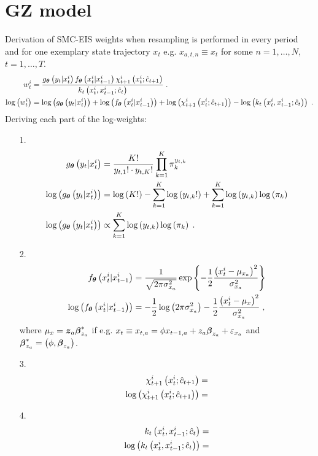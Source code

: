 \section*{GZ model}
Derivation of SMC-EIS weights when resampling is performed in every period and for one exemplary state trajectory $x_t$ e.g. $x_{a,t,n}\equiv x_t$ for some $n=1,\ldots,N$, $t=1,\ldots,T$.
\begin{align*}
w_t^i &= 
\frac
{
g_{\boldsymbol{\theta}}\left(y_t \lvert x_t^i\right) f_{\boldsymbol{\theta}}\left(x_t^i \lvert x_{t-1}^i\right)
\chi_{t+1}^{i}\left(x_{t}^{i}; \hat{c}_{t+1}\right)
}
{
k_{t}\left(x_{t}^{i}, x_{t-1}^{i}; \hat{c}_{t}\right)
}
\;.\\
\log\left(w_t^i\right) 
&=
\log\left(g_{\boldsymbol{\theta}}\left(y_t \lvert x_t^i\right)\right) +
\log\left(f_{\boldsymbol{\theta}}\left(x_t^i \lvert x_{t-1}^i\right)\right) +
\log\left(\chi_{t+1}^{i}\left(x_{t}^{i}; \hat{c}_{t+1}\right)\right) -
\log\left(k_{t}\left(x_{t}^{i}, x_{t-1}^{i}; \hat{c}_{t}\right)\right)\;.
\end{align*}
Deriving each part of the log-weights:
\begin{itemize}
\item[1.] 
\begin{align*}
g_{\boldsymbol{\theta}} \left(y_t \lvert x_t^i\right) 
&=
\frac{K!}{y_{t,1}!\cdot y_{t,K}!}
\prod_{k=1}^{K} \pi_k^{y_{t,k}}
\\
\log\left(g_{\boldsymbol{\theta}}\left(y_t \lvert x_t^i \right)\right)
&=
\log\left(K!\right) -
\sum_{k=1}^{K} \log\left(y_{t,k}!\right) +
\sum_{k=1}^{K} \log\left(y_{t,k}\right)\log\left(\pi_k\right)
\\
\log\left(g_{\boldsymbol{\theta}}\left(y_t \lvert x_t^i \right)\right)
&\propto \sum_{k=1}^{K} \log\left(y_{t,k}\right)\log\left(\pi_k\right)\;.
\end{align*}
\item[2.]
\begin{align*}
f_{\boldsymbol{\theta}}\left(x_t^i \lvert x_{t-1}^i\right)
&=
\frac{1}{\sqrt{2\pi\sigma_{x_a}^2}}
\exp
\left\{
-\frac{1}{2}
\frac{\left(x_t^i-\mu_{x_a}\right)^2}
{\sigma_{x_a}^2}
\right\}
\\
\log\left(f_{\boldsymbol{\theta}}\left(x_t^i \lvert x_{t-1}^i\right)\right)
&= 
-\frac{1}{2}\log\left(2\pi\sigma_{x_a}^2\right)
-\frac{1}{2}\frac{\left(x_t^i-\mu_{x}\right)^2}
{\sigma_{x_a}^2}\;,
\end{align*}
where $\mu_{x}=\boldsymbol{z}_a\boldsymbol{\beta}_{z_a}^*$ if e.g.  $x_t\equiv x_{t,a}=\phi x_{t-1,a} + z_a\boldsymbol{\beta}_{z_a} + \varepsilon_{x_a}$ and $\boldsymbol{\beta}_{z_a}^*=\left(\phi,\boldsymbol{\beta}_{z_a}\right)$.
\item[3.]
\begin{align*}
\chi_{t+1}^{i}\left(x_{t}^{i}; \hat{c}_{t+1}\right)
&=
\\
\log\left(\chi_{t+1}^{i}\left(x_{t}^{i}; \hat{c}_{t+1}\right)\right)
&=
\end{align*}
\item[4.]
\begin{align*}
k_{t}\left(x_{t}^{i}, x_{t-1}^{i}; \hat{c}_{t}\right)
&=
\\
\log\left(k_{t}\left(x_{t}^{i}, x_{t-1}^{i}; \hat{c}_{t}\right)\right)
&=
\end{align*}
\end{itemize}
